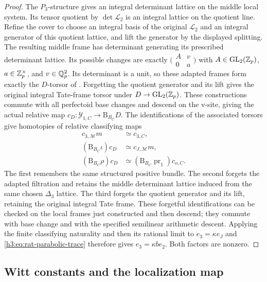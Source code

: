 \begin{proof}
The $P_3$-structure gives an integral determinant lattice
on the middle local system.  Its tensor quotient by
$\det\mathcal L_2$ is an integral lattice on the quotient
line.  Refine the cover to choose an integral basis of the
original $\mathcal L_2$ and an integral generator of this
quotient lattice, and lift the generator by the displayed
splitting.  The resulting middle frame has determinant
generating its prescribed determinant lattice.  Its possible
changes are exactly
$\bigl(\begin{smallmatrix}A&v\\0&a\end{smallmatrix}\bigr)$
with $A\in\operatorname{GL}_2(\mathbb Z_p)$, $a\in\mathbb Z_p^\times$, and
$v\in\mathbb Q_p^2$.  Its determinant is a unit, so these adapted
frames form exactly the $D$-torsor of .
Forgetting the quotient generator and its lift gives the
original integral Tate-frame torsor under $D\to\operatorname{GL}_2(\mathbb Z_p)$.
These constructions commute with all perfectoid base changes
and descend on the v-site, giving the actual relative map
$c_D:\mathcal Y_{1,C}\to\mathrm B_{B_C}D$.  The identifications of
the associated torsors give homotopies of relative classifying maps
\[
 \begin{aligned}
 c_{3,\mathcal M}m&\simeq c_{3,C},\\
 (\mathrm B_{B_C}\iota)c_D&\simeq c_{J,\mathcal M}m,\\
 (\mathrm B_{B_C}\rho)c_D
     &\simeq(\mathrm B_{B_C}\operatorname{pr}_1)c_{o,C}.
 \end{aligned}
\]
The first remembers the same structured positive bundle.  The second
forgets the adapted filtration and retains the middle determinant
lattice induced from the same chosen $\Delta_3$ lattice.  The third
forgets the quotient generator and
its lift, retaining the original integral Tate frame.  These
forgetful identifications can be checked on the local frames just
constructed and then descend; they commute with base change and with
the specified semilinear arithmetic descent.  Applying the finite
classifying naturality and then its rational limit to
$e_3=\kappa e_J$ and \eqref{h3:eq:rat-parabolic-trace} therefore gives
$e_3=\kappa b e_2$.  Both factors are nonzero.
\end{proof}

\subsection{Witt constants and the localization map}

